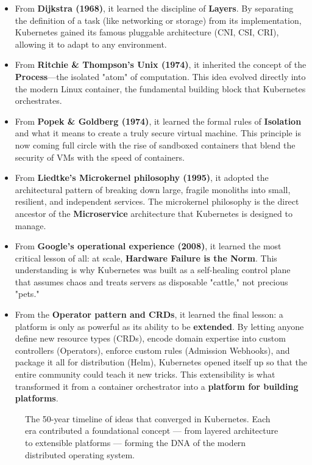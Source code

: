 \begin{itemize}
\item From \textbf{Dijkstra (1968)}, it learned the discipline of \textbf{Layers}. By separating the definition of a task (like networking or storage) from its implementation, Kubernetes gained its famous pluggable architecture (CNI, CSI, CRI), allowing it to adapt to any environment.
\item From \textbf{Ritchie \& Thompson's Unix (1974)}, it inherited the concept of the \textbf{Process}---the isolated "atom" of computation. This idea evolved directly into the modern Linux container, the fundamental building block that Kubernetes orchestrates.
\item From \textbf{Popek \& Goldberg (1974)}, it learned the formal rules of \textbf{Isolation} and what it means to create a truly secure virtual machine. This principle is now coming full circle with the rise of sandboxed containers that blend the security of VMs with the speed of containers.
\item From \textbf{Liedtke's Microkernel philosophy (1995)}, it adopted the architectural pattern of breaking down large, fragile monoliths into small, resilient, and independent services. The microkernel philosophy is the direct ancestor of the \textbf{Microservice} architecture that Kubernetes is designed to manage.
\item From \textbf{Google's operational experience (2008)}, it learned the most critical lesson of all: at scale, \textbf{Hardware Failure is the Norm}. This understanding is why Kubernetes was built as a self-healing control plane that assumes chaos and treats servers as disposable "cattle," not precious "pets."
\item From the \textbf{Operator pattern and CRDs}, it learned the final lesson: a platform is only as powerful as its ability to be \textbf{extended}. By letting anyone define new resource types (CRDs), encode domain expertise into custom controllers (Operators), enforce custom rules (Admission Webhooks), and package it all for distribution (Helm), Kubernetes opened itself up so that the entire community could teach it new tricks. This extensibility is what transformed it from a container orchestrator into a \textbf{platform for building platforms}.
\end{itemize}
\begin{figure}[htbp]
\centering

\caption{The 50-year timeline of ideas that converged in Kubernetes. Each era contributed a foundational concept --- from layered architecture to extensible platforms --- forming the DNA of the modern distributed operating system.}
\label{fig:C_1}
\end{figure}



